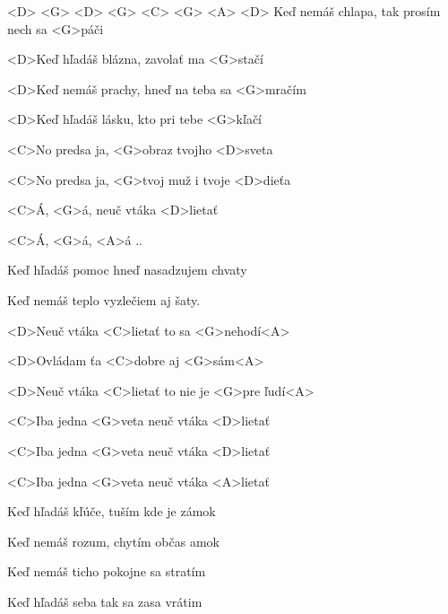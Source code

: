 

<D> <G> <D> <G> <C> <G> <A> <D>
\zs
Keď nemáš chlapa, tak prosím nech sa <G>páči

<D>Keď hľadáš blázna, zavolať ma <G>stačí

<D>Keď nemáš prachy, hneď na teba sa <G>mračím

<D>Keď hľadáš lásku, kto pri tebe <G>kľačí
\ks

\zr
<C>No predsa ja, <G>obraz tvojho <D>sveta

<C>No predsa ja, <G>tvoj muž i tvoje <D>dieťa

<C>Á, <G>á, neuč vtáka <D>lietať

<C>Á, <G>á, <A>á ..
\kr

\zs
Keď hľadáš pomoc hneď nasadzujem chvaty

Keď nemáš teplo vyzlečiem aj šaty.
\ks

\zr
<D>Neuč vtáka <C>lietať to sa <G>nehodí<A> 

<D>Ovládam ťa <C>dobre aj <G>sám<A>

<D>Neuč vtáka <C>lietať to nie je <G>pre ľudí<A> 

<C>Iba jedna <G>veta neuč vtáka <D>lietať

<C>Iba jedna <G>veta neuč vtáka <D>lietať

<C>Iba jedna <G>veta neuč vtáka <A>lietať
\kr

\zs
Keď hľadáš kľúče, tuším kde je zámok

Keď nemáš rozum, chytím občas amok

Keď nemáš ticho pokojne sa stratím

Keď hľadáš seba tak sa zasa vrátim
\ks

\zr \kr

\kp
